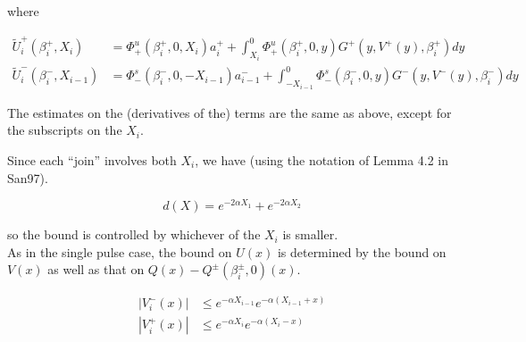 \documentclass[12pt]{article}
\begin{document}
where

\begin{align*}
\tilde{U}_i^+(\beta_i^+, X_i) &= \Phi^u_+(\beta_i^+, 0, X_i) a_i^+ + \int_{X_i}^0 \Phi_+^u(\beta_i^+, 0, y) G^+(y, V^+(y),\beta_i^+)dy \\ 
\tilde{U}_i^-(\beta_i^-, X_{i-1}) &= \Phi^s_-(\beta_i^-, 0, -X_{i-1}) a_{i-1}^- + \int_{-X_{i-1}}^0 \Phi_-^s(\beta_i^-, 0, y) G^-(y, V^-(y),\beta_i^-)dy 
\end{align*}

The estimates on the (derivatives of the) terms are the same as above, except for the subscripts on the $X_i$. 


Since each ``join'' involves both $X_i$, we have (using the notation of Lemma 4.2 in San97). 

\[
d(X) = e^{-2 \alpha X_1} + e^{-2 \alpha X_2}
\]

so the bound is controlled by whichever of the $X_i$ is smaller. \\

As in the single pulse case, the bound on $U(x)$ is determined by the bound on $V(x)$ as well as that on $Q(x) - Q^\pm(\beta_i^\pm, 0)(x)$.

\begin{align*}
|V_i^-(x)| &\leq e^{-\alpha X_{i-1}} e^{-\alpha(X_{i-1} + x)} \\
|V_i^+(x)| &\leq e^{-\alpha X_i} e^{-\alpha(X_i - x)} \\
\end{align*}
\end{document}
